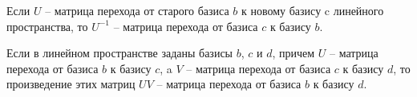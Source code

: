\begin{property}[3]
  Если $U$ -- матрица перехода от старого базиса $b$ к новому базису c линейного пространства, то $U^{-1}$ -- матрица перехода от базиса $c$ к базису $b$.
\end{property}

\begin{property}[4]
  Если в линейном пространстве заданы базисы $b$, $c$ и $d$, причем $U$ -- матрица перехода от базиса $b$ к базису $c$, a $V$ -- матрица перехода от базиса $c$ к базису $d$, то произведение этих матриц $UV$ -- матрица перехода от базиса $b$ к базису $d$.
\end{property}

